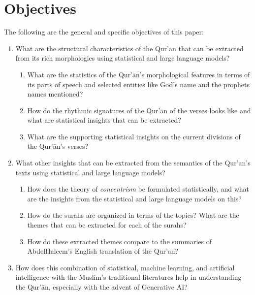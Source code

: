 \section{Objectives}\label{sec:objectives}
The following are the general and specific objectives of this paper:
\begin{enumerate}
    \item What are the structural characteristics of the Qur'an that can be extracted from its rich morphologies using statistical and large language models?
    \begin{enumerate}
        \item What are the statistics of the Qur'\=an's morphological features in terms of its parts of speech and selected entities like God's name and the prophets names mentioned?
        
        \item How do the rhythmic signatures of the Qur'\=an of the verses looks like and what are statistical insights that can be extracted?
        
        \item What are the supporting statistical insights on the current divisions of the Qur'\=an's verses? 
    \end{enumerate}
    
    \item What other insights that can be extracted from the semantics of the Qur'an's texts using statistical and large language models?
    \begin{enumerate}
        \item How does the theory of \textit{concentrism} be formulated statistically, and what are the insights from the statistical and large language models on this? 
        
        \item How do the surahs are organized in terms of the topics? What are the themes that can be extracted for each of the surahs?
        
        \item How do these extracted themes compare to the summaries of Abdel\linebreak Haleem's English translation of the Qur'an?
    \end{enumerate}
    
    \item How does this combination of statistical, machine learning, and artificial intelligence with the Muslim's traditional literatures help in understanding the Qur'\=an, especially with the advent of Generative AI?
\end{enumerate}

